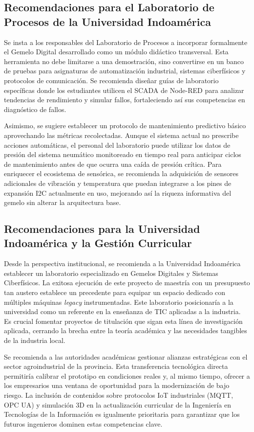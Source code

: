\subsection{Recomendaciones para el Laboratorio de Procesos de la Universidad Indoamérica}
Se insta a los responsables del Laboratorio de Procesos a incorporar formalmente el Gemelo Digital desarrollado como un módulo didáctico transversal. Esta herramienta no debe limitarse a una demostración, sino convertirse en un banco de pruebas para asignaturas de automatización industrial, sistemas ciberfísicos y protocolos de comunicación. Se recomienda diseñar guías de laboratorio específicas donde los estudiantes utilicen el SCADA de Node-RED para analizar tendencias de rendimiento y simular fallos, fortaleciendo así sus competencias en diagnóstico de fallos.

Asimismo, se sugiere establecer un protocolo de mantenimiento predictivo básico aprovechando las métricas recolectadas. Aunque el sistema actual no prescribe acciones automáticas, el personal del laboratorio puede utilizar los datos de presión del sistema neumático monitoreado en tiempo real para anticipar ciclos de mantenimiento antes de que ocurra una caída de presión crítica. Para enriquecer el ecosistema de sensórica, se recomienda la adquisición de sensores adicionales de vibración y temperatura que puedan integrarse a los pines de expansión I2C actualmente en uso, mejorando así la riqueza informativa del gemelo sin alterar la arquitectura base.

\subsection{Recomendaciones para la Universidad Indoamérica y la Gestión Curricular}
Desde la perspectiva institucional, se recomienda a la Universidad Indoamérica establecer un laboratorio especializado en Gemelos Digitales y Sistemas Ciberfísicos. La exitosa ejecución de este proyecto de maestría con un presupuesto tan austero establece un precedente para equipar un espacio dedicado con múltiples máquinas \textit{legacy} instrumentadas. Este laboratorio posicionaría a la universidad como un referente en la enseñanza de TIC aplicadas a la industria. Es crucial fomentar proyectos de titulación que sigan esta línea de investigación aplicada, cerrando la brecha entre la teoría académica y las necesidades tangibles de la industria local.

Se recomienda a las autoridades académicas gestionar alianzas estratégicas con el sector agroindustrial de la provincia. Esta transferencia tecnológica directa permitiría calibrar el prototipo en condiciones reales y, al mismo tiempo, ofrecer a los empresarios una ventana de oportunidad para la modernización de bajo riesgo. La inclusión de contenidos sobre protocolos IoT industriales (MQTT, OPC UA) y simulación 3D en la actualización curricular de la Ingeniería en Tecnologías de la Información es igualmente prioritaria para garantizar que los futuros ingenieros dominen estas competencias clave.

